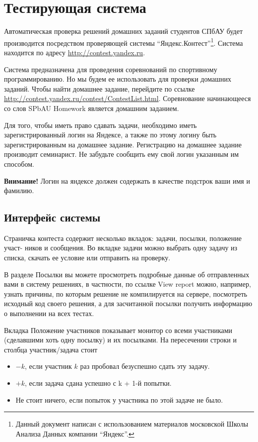 \documentclass[12pt]{article}
\begin{document}
\section{Тестирующая система}

Автоматическая проверка решений домашних заданий студентов СПбАУ будет 
производится посредством проверяющей системы ``Яндекс.Контест''\footnote{Данный документ написан с использованием материалов московской Школы Анализа Данных компании ``Яндекс''.}. 
Система находится по адресу \url{http://contest.yandex.ru}.

Система предназначена для проведения соревнований по спортивному
программированию. Но мы будем ее использовать для проверки домашних
заданий. Чтобы найти домашнее задание, перейдите по ссылке
\url{http://contest.yandex.ru/contest/ContestList.html}.
Соревнование начинающееся со слов SPbAU Homework является
домашним заданием.

Для того, чтобы иметь право сдавать задачи, необходимо иметь зарегистрированный
логин на Яндексе, а также по этому логину быть зарегистрированным на домашнее 
задание. Регистрацию на домашнее задание производит семинарист. Не забудьте 
сообщить ему свой логин указанным им способом.

\textbf{Внимание!} Логин на яндексе должен содержать в качестве подстрок
ваши имя и фамилию.

\subsection{Интерфейс системы}
\label{interface}

Страничка контеста содержит несколько вкладок: задачи, посылки, положение участ-
ников и сообщения. Во вкладке задачи можно выбрать одну задачу из списка, скачать
ее условие или отправить на проверку.

В разделе Посылки вы можете просмотреть подробные данные об отправленных
вами в систему решениях, в частности, по ссылке View report можно, например, узнать
причины, по которым решение не компилируется на сервере, посмотреть исходный код
своего решения, а для засчитанной посылки  получить информацию о выполнении
на всех тестах.

Вкладка Положение участников показывает монитор со всеми участниками (сделавшими хоть 
одну посылку) и их посылками. На пересечении строки и столбца участник/задача стоит
\begin{itemize}
\item $-k$, если участник $k$ раз пробовал безуспешно сдать эту задачу.
\item $+k$, если задача сдана успешно с k + 1-й попытки.
\item Не стоит ничего, если попыток у участника по этой задаче не было. 
\end{itemize}
\end{document}

